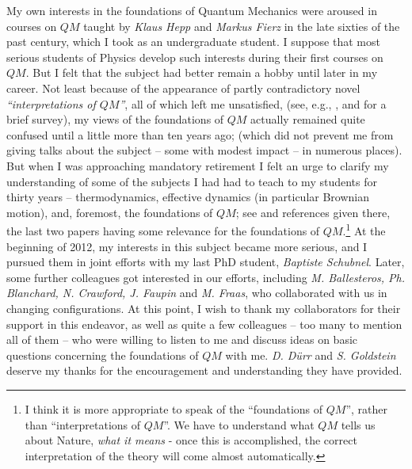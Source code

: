 \documentclass[a4paper,11pt]{article}
\begin{document}
My own interests in the foundations of Quantum Mechanics were aroused in courses on $QM$ taught by \textit{Klaus Hepp} and \textit{Markus Fierz} in the late sixties of the past century, which I took as an undergraduate student. I suppose that most serious students of Physics develop such interests during their first courses on $QM$. But I felt that the subject had better remain a hobby until later in my career. Not least because of the appearance of partly contradictory novel \textit{``interpretations of $QM$''}, all of which left me unsatisfied, (see, e.g., \cite{Griffiths, Durr-Teufel}, and \cite{FS-Vienna} for a brief survey), my views of the foundations of $QM$ actually remained quite confused until a little more than ten years ago; (which did not prevent me from giving talks about the subject -- some with modest impact -- in numerous places). But when I was approaching mandatory retirement I felt an urge to clarify my understanding of some of the subjects I had had to teach to my students for thirty years -- thermodynamics, effective dynamics (in particular Brownian motion), and, foremost, the foundations of $QM$; see \cite{Abou-Salem-F, DeR-Fr, Gang-F, B-DeR-F} and references given there, the last two papers having some relevance for the foundations of $QM$.\footnote{I think it is more appropriate to speak of the ``foundations of $QM$'', rather than ``interpretations of $QM$''. We have to understand what $Q M$ tells us about Nature, \textit{what it means} - once this is accomplished, the correct interpretation of the theory will come almost automatically.} At the beginning of 2012, my interests in this subject became more serious, and I pursued them in joint efforts with my last PhD student, \textit{Baptiste Schubnel}. Later, some further colleagues got interested in our efforts, including \textit{M. Ballesteros, Ph. Blanchard, N. Crawford, J. Faupin} and \textit{M. Fraas}, who collaborated with us in changing configurations. At this point, I wish to thank my collaborators for their support in this endeavor, as well as quite a few colleagues -- too many to mention all of them -- who were willing to listen to me and discuss ideas on basic questions concerning the foundations of $QM$ with me. \textit{D. D\"{u}rr} and \textit{S. Goldstein} deserve my thanks for the encouragement and understanding they have provided.
\end{document}
